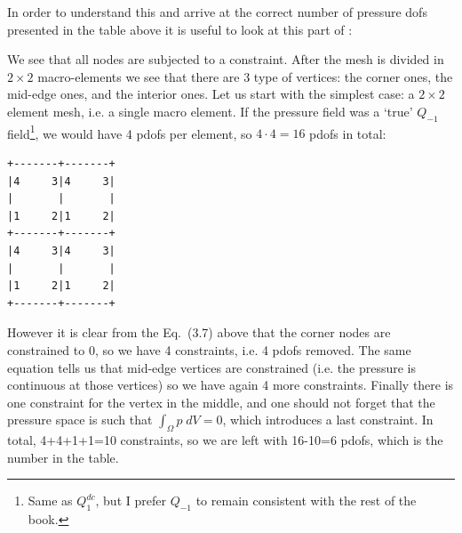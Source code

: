 In order to understand this and arrive at the correct number of pressure dofs
presented in the table above 
it is useful to look at this part of \textcite{huzh11}:

\begin{center}
\end{center}

We see that all nodes are subjected to a constraint. After the mesh is divided 
in $2\times 2$ macro-elements we see that there are 3 type of vertices: the corner ones, 
the mid-edge ones, and the interior ones. 
Let us start with the simplest case: a $2\times 2$ element mesh, i.e. a single macro element.
If the pressure field was a `true' $Q_{-1}$ field\footnote{
Same as $Q_1^{dc}$, but I prefer $Q_{-1}$ to remain consistent 
with the rest of the book.}, we would have 4 pdofs per element,
so $4\cdot 4=16$ pdofs in total:
\begin{verbatim}
+-------+-------+
|4     3|4     3|
|       |       |
|1     2|1     2|
+-------+-------+
|4     3|4     3|
|       |       |
|1     2|1     2|
+-------+-------+
\end{verbatim}
However it is clear from the Eq.~(3.7) above that the corner nodes are constrained to 0, so we
have 4 constraints, i.e. 4 pdofs removed. 
The same equation tells us that mid-edge vertices are constrained (i.e. the pressure 
is continuous at those vertices) so we have again 4 more constraints.
Finally there is one constraint for the vertex in the middle, and one should not 
forget that the pressure space is such that  $\int _\Omega p \; dV=0$, which 
introduces a last constraint. 
In total, 4+4+1+1=10 constraints, so we are left with 16-10=6 pdofs, which is the 
number in the table.

